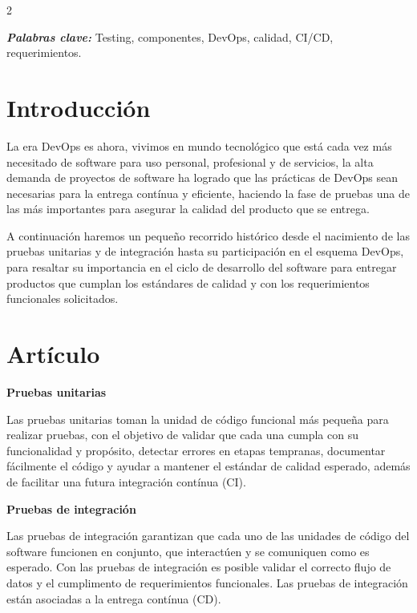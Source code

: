 \documentclass[12pt,spanish,Letterpaper,openany]{book}
\begin{document}
\begin {multicols}{2}

\textbf{\emph{Palabras clave:}} Testing, componentes, DevOps, calidad, CI/CD, requerimientos.

\hypertarget{introducciuxf3n-6}{%
\section{Introducción}\label{introducciuxf3n-6}}

La era DevOps es ahora, vivimos en mundo tecnológico que está cada vez más necesitado de software para uso personal, profesional y de servicios, la alta demanda de proyectos de software ha logrado que las prácticas de DevOps sean necesarias para la entrega contínua y eficiente, haciendo la fase de pruebas una de las más importantes para asegurar la calidad del producto que se entrega.

A continuación haremos un pequeño recorrido histórico desde el nacimiento de las pruebas unitarias y de integración hasta su participación en el esquema DevOps, para resaltar su importancia en el ciclo de desarrollo del software para entregar productos que cumplan los estándares de calidad y con los requerimientos funcionales solicitados.

\hypertarget{artuxedculo-6}{%
\section{Artículo}\label{artuxedculo-6}}

\textbf{Pruebas unitarias}

Las pruebas unitarias toman la unidad de código funcional más pequeña para realizar pruebas, con el objetivo de validar que cada una cumpla con su funcionalidad y propósito, detectar errores en etapas tempranas, documentar fácilmente el código y ayudar a mantener el estándar de calidad esperado, además de facilitar una futura integración contínua (CI).

\textbf{Pruebas de integración}

Las pruebas de integración garantizan que cada uno de las unidades de código del software funcionen en conjunto, que interactúen y se comuniquen como es esperado. Con las pruebas de integración es posible validar el correcto flujo de datos y el cumplimento de requerimientos funcionales. Las pruebas de integración están asociadas a la entrega contínua
(CD).

\bigskip
\bigskip
\bigskip


\end{multicols}
\end{document}
